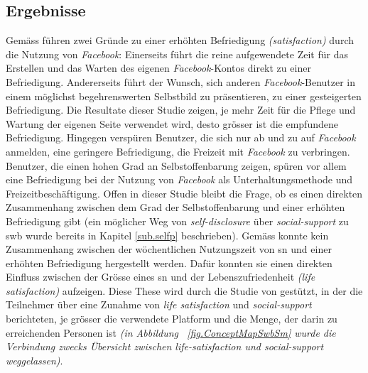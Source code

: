 \subsection{Ergebnisse}\label{subsec.amountErgebnisse}
Gemäss  führen zwei Gründe zu einer erhöhten Befriedigung \textit{(satisfaction)} durch die Nutzung von \textit{Facebook}: Einerseits führt die reine aufgewendete Zeit für das Erstellen und das Warten des eigenen \textit{Facebook}-Kontos direkt zu einer Befriedigung. Andererseits führt der Wunsch, sich anderen \textit{Facebook}-Benutzer in einem möglichst begehrenswerten Selbstbild zu präsentieren, zu einer gesteigerten Befriedigung. Die Resultate dieser  Studie zeigen, je mehr Zeit für die Pflege und Wartung der eigenen Seite verwendet wird, desto grösser ist die empfundene Befriedigung. Hingegen verspüren Benutzer, die sich nur ab und zu auf \textit{Facebook} anmelden, eine geringere Befriedigung, die Freizeit mit \textit{Facebook} zu verbringen. \newline
Benutzer, die einen hohen Grad an Selbstoffenbarung zeigen, spüren vor allem eine Befriedigung bei der Nutzung von \textit{Facebook} als Unterhaltungsmethode und Freizeitbeschäftigung. Offen in dieser Studie bleibt die Frage, ob es einen direkten Zusammenhang zwischen dem Grad der Selbstoffenbarung und einer erhöhten Befriedigung gibt (ein möglicher Weg von \textit{self-disclosure} über \textit{social-support} zu \gls{swb} wurde bereits in Kapitel \ref{sub.selfp} beschrieben).\newline
Gemäss  konnte kein Zusammenhang zwischen der wöchentlichen Nutzungszeit von \gls{sn} und einer erhöhten Befriedigung hergestellt werden. Dafür konnten sie einen direkten Einfluss zwischen der Grösse eines \gls{sn} und der Lebenszufriedenheit \textit{(life satisfaction)} aufzeigen. Diese These wird durch die Studie von  gestützt, in der die Teilnehmer über eine Zunahme von \textit{life satisfaction} und \textit{social-support} berichteten, je grösser die verwendete Platform und die Menge, der darin zu erreichenden Personen ist \textit{(in Abbildung ~\ref{fig.ConceptMapSwbSm} wurde die Verbindung zwecks Übersicht zwischen life-satisfaction und social-support weggelassen)}. 

